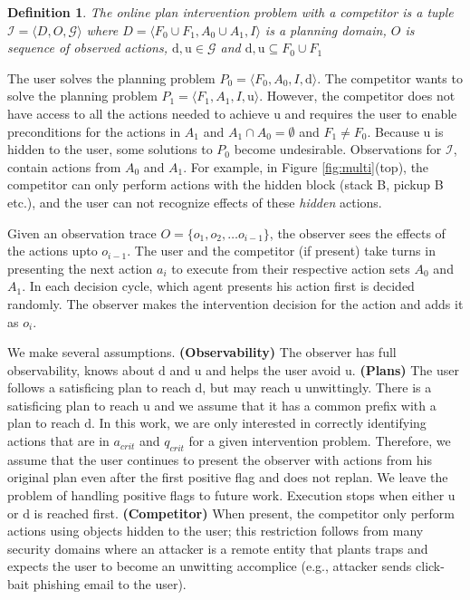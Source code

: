 \documentclass[letterpaper]{article}
\theoremstyle{plain}
\newtheorem{definition}{Definition}
\begin{document}
\begin{definition}
The \textnormal{online plan intervention problem} with a competitor is a tuple $\mathcal{I} = \langle D, O, \mathcal{G} \rangle$ where $D=\langle F_0\cup F_1, A_0\cup A_1, I \rangle$ is a planning domain, 
$O$ is  sequence of observed actions, $\mathrm{d},\mathrm{u} \in \mathcal{G}$ and 
$\mathrm{d}, \mathrm{u} \subseteq F_0\cup F_1$
\end{definition}
The user solves the planning problem $P_0=\langle F_0, A_0, I,\mathrm{d}\rangle$.
The competitor wants to solve the planning problem $P_1=\langle F_1, A_1, I,\mathrm{u}\rangle$.
However, the competitor does not have access to all the actions needed to achieve $\mathrm{u}$ and requires the user to enable preconditions for the actions in $A_1$ and $A_1 \cap A_0=\emptyset$ and $F_1 \neq F_0$. Because $\mathrm{u}$ is hidden to the user, some solutions to $P_0$ become undesirable.
Observations for $\mathcal{I}$, contain actions from $A_0$ and $A_1$.
For example, in Figure \ref{fig:multi}(top), the competitor can only perform actions with the hidden block (stack B, pickup B etc.), and the user can not recognize effects of these \textit{hidden} actions. 

Given an observation trace $O = \lbrace o_1, o_2,\ldots o_{i-1}\rbrace$, the observer sees the effects of the actions upto $o_{i-1}$. The user and the competitor (if present) take turns in presenting the next action $a_i$ to execute from their respective action sets $A_0$ and $A_1$. In each decision cycle, which agent presents his action first is decided randomly. The observer makes the intervention decision for the action and adds it as $o_{i}$.

We make several assumptions.
\textbf{(Observability)} 
The observer has full observability, knows about  $\mathrm{d}$ and $\mathrm{u}$ and helps the user avoid $\mathrm{u}$.
\textbf{(Plans)} 
The user follows a satisficing plan to reach $\mathrm{d}$, but may reach $\mathrm{u}$ unwittingly. 
There is a satisficing plan to reach $\mathrm{u}$ and we assume that it has a common prefix with a plan to reach $\mathrm{d}$. In this work, we are only interested in correctly identifying actions that are in $a_{crit}$ and $q_{crit}$ for a given intervention problem. Therefore, we assume that  the user continues to present the observer with actions from his original plan even after the first positive flag and does not replan. We leave the problem of handling positive flags to future work.
Execution stops when either $\mathrm{u}$ or $\mathrm{d}$ is reached first.
\textbf{(Competitor)}
When present, the competitor only perform actions using objects hidden to the user; this restriction follows from many security domains where an attacker is a remote entity that plants traps and expects the user to become an unwitting accomplice (e.g., attacker sends click-bait phishing email to the user).
\end{document}
